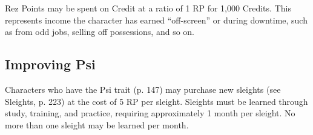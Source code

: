 Rez Points may be spent on Credit at a ratio of 1 RP for 1,000 Credits. This represents income the character has earned “off-screen” or during downtime, such as from odd jobs, selling off possessions, and so on.

\subsection{Improving Psi}
\label{sec:improving-psi}

Characters who have the Psi trait (p. 147) may purchase new sleights (see Sleights, p. 223) at the cost of 5 RP per sleight. Sleights must be learned through study, training, and practice, requiring approximately 1 month per sleight. No more than one sleight may be learned per month.


